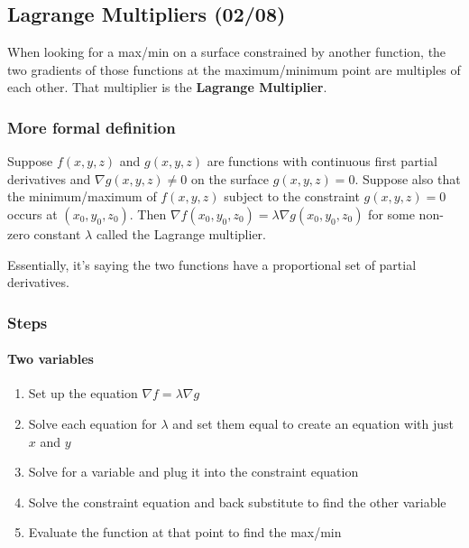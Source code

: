 \documentclass[
  letterpaper,
  DIV=11,
  numbers=noendperiod]{scrartcl}
\let\oldparagraph\paragraph
\renewcommand{\paragraph}[1]{\oldparagraph{#1}\mbox{}}
\providecommand{\tightlist}{%
  \setlength{\itemsep}{0pt}\setlength{\parskip}{0pt}}\usepackage{longtable,booktabs,array}
\begin{document}
\newpage{}

\subsection{Lagrange Multipliers
(02/08)}\label{lagrange-multipliers-0208}

When looking for a max/min on a surface constrained by another function,
the two gradients of those functions at the maximum/minimum point are
multiples of each other. That multiplier is the \textbf{Lagrange
Multiplier}.

\subsubsection{More formal definition}\label{more-formal-definition}

Suppose \(f(x,y,z)\) and \(g(x,y,z)\) are functions with continuous
first partial derivatives and \(\nabla g(x,y,z) \ne 0\) on the surface
\(g(x,y,z) = 0\). Suppose also that the minimum/maximum of
\(f(x, y, z)\) subject to the constraint \(g(x,y,z) = 0\) occurs at
\((x_0, y_0, z_0)\). Then
\(\nabla f(x_0, y_0, z_0) = \lambda \nabla g(x_0, y_0, z_0)\) for some
non-zero constant \(\lambda\) called the Lagrange multiplier.

Essentially, it's saying the two functions have a proportional set of
partial derivatives.

\subsubsection{Steps}\label{steps}

\paragraph{Two variables}\label{two-variables}

\begin{enumerate}
\def\labelenumi{\arabic{enumi})}
\tightlist
\item
  Set up the equation \(\nabla f = \lambda \nabla g\)
\item
  Solve each equation for \(\lambda\) and set them equal to create an
  equation with just \(x\) and \(y\)
\item
  Solve for a variable and plug it into the constraint equation
\item
  Solve the constraint equation and back substitute to find the other
  variable
\item
  Evaluate the function at that point to find the max/min
\end{enumerate}
\end{document}
